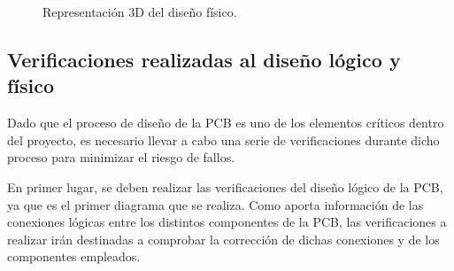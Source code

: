 \begin{figure}[htbp]
    \centering
    \hfill
    \caption{Representación 3D del diseño físico.} 
    \label{fig:Simulacion_3D}
\end{figure}
    
\subsection{Verificaciones realizadas al diseño lógico y físico}

Dado que el proceso de diseño de la \ac{PCB} es uno de los elementos críticos dentro del proyecto, es necesario llevar a cabo una serie de verificaciones durante dicho proceso para minimizar el riesgo de fallos.

En primer lugar, se deben realizar las verificaciones del diseño lógico de la \ac{PCB}, ya que es el primer diagrama que se realiza. Como aporta información de las conexiones lógicas entre los distintos componentes de la \ac{PCB}, las verificaciones a realizar irán destinadas a comprobar la corrección de dichas conexiones y de los componentes empleados.

